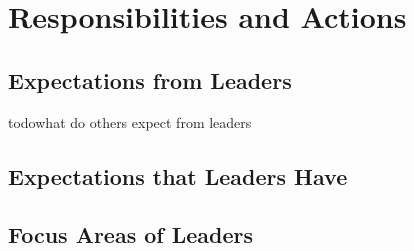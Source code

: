 \chapter{Responsibilities and Actions}
\label{chapter:responsibilities}
\section{Expectations from Leaders}
\label{sec:fromleads}
todo{what do others expect from leaders}

\section{Expectations that Leaders Have}
\label{sec:byleaders}

\section{Focus Areas of Leaders}
\label{sec:focus}
